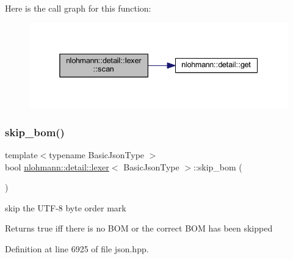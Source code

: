 Here is the call graph for this function\+:
\nopagebreak
\begin{figure}[H]
\begin{center}
\leavevmode
\includegraphics[width=338pt]{classnlohmann_1_1detail_1_1lexer_aac3041cd2b9291e64fee38db422863c9_cgraph}
\end{center}
\end{figure}
\mbox{\label{classnlohmann_1_1detail_1_1lexer_a709afd52def2e258dac0b8a67dc4ea26}} 
\subsubsection{\texorpdfstring{skip\_bom()}{skip\_bom()}}
{\footnotesize\ttfamily template$<$typename Basic\+Json\+Type $>$ \\
bool \mbox{\hyperlink{classnlohmann_1_1detail_1_1lexer}{nlohmann\+::detail\+::lexer}}$<$ Basic\+Json\+Type $>$\+::skip\+\_\+bom (\begin{DoxyParamCaption}{ }\end{DoxyParamCaption})\hspace{0.3cm}{\ttfamily [inline]}}



skip the U\+T\+F-\/8 byte order mark 

\begin{DoxyReturn}{Returns}
true iff there is no B\+OM or the correct B\+OM has been skipped 
\end{DoxyReturn}


Definition at line 6925 of file json.\+hpp.

